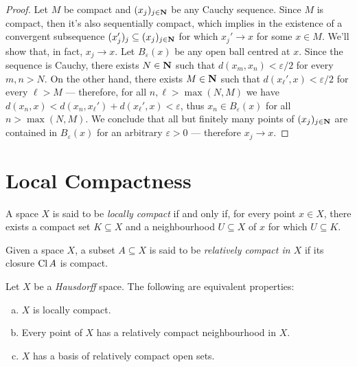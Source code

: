 \begin{proof}
Let \(M\) be compact and \((x_j)_{j \in \mathbf{N}}\) be any Cauchy sequence. Since
\(M\) is compact, then it's also sequentially compact, which implies in the
existence of a convergent subsequence \((x_j')_j \subseteq (x_j)_{j \in \mathbf{N}}\)
for which \(x_j' \to x\) for some \(x \in M\). We'll show that, in fact,
\(x_j \to x\). Let \(B_{\varepsilon}(x)\) be any open ball centred at
\(x\). Since the sequence is Cauchy, there exists \(N \in \mathbf{N}\) such that
\(d(x_m, x_n) < \varepsilon/2\) for every \(m, n > N\). On the other hand, there
exists \(M \in \mathbf{N}\) such that \(d(x_{\ell}', x) < \varepsilon/2\) for every
\(\ell > M\) --- therefore, for all \(n, \ell > \max(N, M)\) we have
\(d(x_n, x) < d(x_n, x_{\ell}') + d(x_{\ell}', x) < \varepsilon\), thus
\(x_n \in B_{\varepsilon}(x)\) for all \(n > \max(N, M)\). We conclude that all
but finitely many points of \((x_j)_{j \in \mathbf{N}}\) are contained in
\(B_{\varepsilon}(x)\) for an arbitrary \(\varepsilon > 0\) --- therefore
\(x_j \to x\).
\end{proof}

\section{Local Compactness}

\begin{definition}
\label{def:locally-compact}
A space \(X\) is said to be \emph{locally compact} if and only if, for every
point \(x \in X\), there exists a compact set \(K \subseteq X\) and a
neighbourhood \(U \subseteq X\) of \(x\) for which \(U \subseteq K\).
\end{definition}

\begin{definition}
\label{def:relatively-compact}
Given a space \(X\), a subset \(A \subseteq X\) is said to be \emph{relatively
  compact in \(X\)} if its closure \(\operatorname{Cl} A\) is compact.
\end{definition}

\begin{proposition}
\label{prop:hausdorff-locally-and-relatively-compact}
Let \(X\) be a \emph{Hausdorff} space. The following are equivalent properties:
\begin{enumerate}[(a)]\setlength\itemsep{0em}
\item \(X\) is locally compact.
\item Every point of \(X\) has a relatively compact neighbourhood in \(X\).
\item \(X\) has a basis of relatively compact open sets.
\end{enumerate}
\end{proposition}

